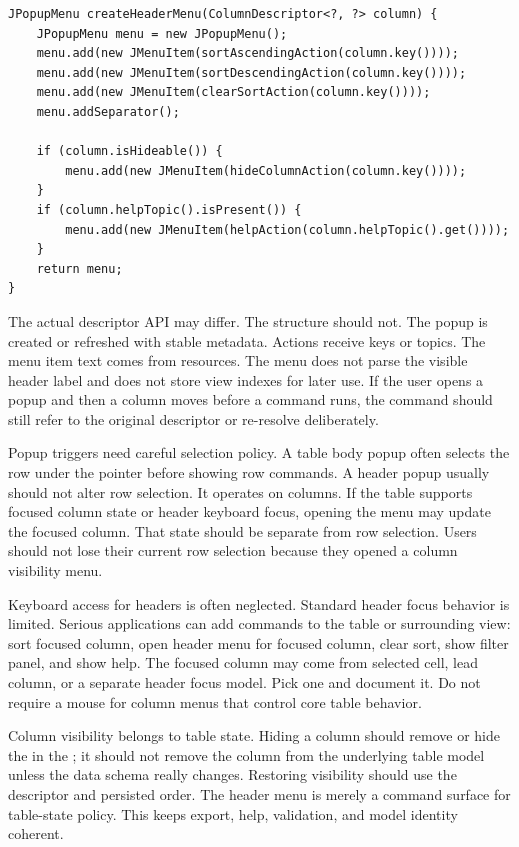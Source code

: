 \begin{lstlisting}[caption={A header popup receives a column descriptor.}]
JPopupMenu createHeaderMenu(ColumnDescriptor<?, ?> column) {
    JPopupMenu menu = new JPopupMenu();
    menu.add(new JMenuItem(sortAscendingAction(column.key())));
    menu.add(new JMenuItem(sortDescendingAction(column.key())));
    menu.add(new JMenuItem(clearSortAction(column.key())));
    menu.addSeparator();

    if (column.isHideable()) {
        menu.add(new JMenuItem(hideColumnAction(column.key())));
    }
    if (column.helpTopic().isPresent()) {
        menu.add(new JMenuItem(helpAction(column.helpTopic().get())));
    }
    return menu;
}
\end{lstlisting}

The actual descriptor API may differ. The structure should not. The popup is created or
refreshed with stable metadata. Actions receive keys or topics. The menu item text comes
from resources. The menu does not parse the visible header label and does not store view
indexes for later use. If the user opens a popup and then a column moves before a
command runs, the command should still refer to the original descriptor or re-resolve
deliberately.

Popup triggers need careful selection policy. A table body popup often selects the row
under the pointer before showing row commands. A header popup usually should not alter
row selection. It operates on columns. If the table supports focused column state or
header keyboard focus, opening the menu may update the focused column. That state should
be separate from row selection. Users should not lose their current row selection
because they opened a column visibility menu.

Keyboard access for headers is often neglected. Standard  header focus
behavior is limited. Serious applications can add commands to the table or surrounding
view: sort focused column, open header menu for focused column, clear sort, show filter
panel, and show help. The focused column may come from selected cell, lead column, or a
separate header focus model. Pick one and document it. Do not require a mouse for column
menus that control core table behavior.

Column visibility belongs to table state. Hiding a column should remove or hide the
 in the
; it should not
remove the column from the underlying table model unless the data schema really changes.
Restoring visibility should use the descriptor and persisted order. The header menu is
merely a command surface for table-state policy. This keeps export, help, validation,
and model identity coherent.

